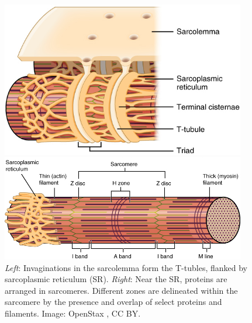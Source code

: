 \documentclass[12pt]{article}
\begin{document}
\begin{figure}[h!]
\begin{minipage}{.45\textwidth}
\centering
\includegraphics[width=0.95\textwidth]{figures/T-tubule.jpg}
\end{minipage}%
\begin{minipage}{.52\textwidth}
\centering
\includegraphics[width=0.95\textwidth]{figures/SRsarcomere.png}
\end{minipage}
\caption{\textit{Left}: Invaginations in the sarcolemma form the T-tubles, flanked by sarcoplasmic reticulum (SR). \textit{Right}: Near the SR, proteins are arranged in sarcomeres. Different zones are delineated within the sarcomere by the presence and overlap of select proteins and filaments. Image: OpenStax \cite{openStax2016muscle}, CC BY.}
\label{fig:ttubules}
\end{figure}
\end{document}
